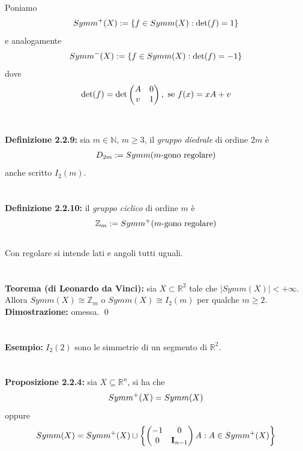 \documentclass{article}
\begin{document}
Poniamo
\begin{gather}
    Symm^+(X) := \{ f \in Symm(X) : \det (f) = 1 \} \notag
\end{gather}
e analogamente
\begin{gather}
    Symm^-(X) := \{ f \in Symm(X) : \det (f) = -1 \} \notag
\end{gather}
dove
\begin{gather}
    \det (f) = \det \begin{pmatrix}
        A & 0 \\
        v & 1
    \end{pmatrix}, \text{ se } f(x) = xA + v \notag
\end{gather} \\ \\
\textbf{Definizione 2.2.9:} sia $m \in \mathbb{N}$, $m \geq 3$, il \textit{gruppo diedrale} di ordine $2m$ è
\begin{gather}
    D_{2m} := Symm(m\text{-gono regolare}) \notag
\end{gather}
anche scritto $I_2(m)$. \\ \\ \\
\textbf{Definizione 2.2.10:} il \textit{gruppo ciclico} di ordine $m$ è
\begin{gather}
    \mathbb{Z}_m := Symm^+(m\text{-gono regolare}) \notag
\end{gather} \\
Con regolare si intende lati e angoli tutti uguali. \\ \\ \\
\textbf{Teorema (di Leonardo da Vinci):} sia $X \subset \mathbb{R}^2$ tale che $|Symm(X)| < +\infty$. Allora $Symm(X) \cong \mathbb{Z}_m$ o $Symm(X) \cong I_2(m)$ per qualche $m \geq 2$. \\

\textbf{Dimostrazione:} omessa. \qed \\ \\ \\
\textbf{Esempio:} $I_2(2)$ sono le simmetrie di un segmento di $\mathbb{R}^2$. \\ \\ \\
\textbf{Proposizione 2.2.4:} sia $X \subseteq \mathbb{R}^n$, si ha che
\begin{gather}
    Symm^+(X) = Symm(X) \notag
\end{gather}
oppure
\begin{gather}
    Symm(X) = Symm^+(X) \cup \left\{ \begin{pmatrix}
        -1 & 0 \\
        0 & \mathbf{I}_{n - 1}
    \end{pmatrix} A : A \in Symm^+(X) \right\} \notag
\end{gather} \\
\end{document}

